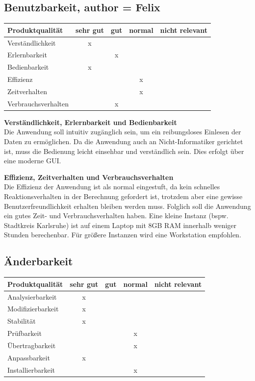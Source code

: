\documentclass[parskip=full]{scrartcl} %
\begin{document}
\subsection{Benutzbarkeit, author = Felix}

    \begin{tabular}{|l| c| c| c| c|}
    \hline
        Produktqualität & sehr gut & gut & normal & nicht relevant \\
    \hline
        Verständlichkeit & x & & &\\
    \hline
        Erlernbarkeit & & x & &\\
    \hline
        Bedienbarkeit & x & & &\\
    \hline
        Effizienz & & & x &\\
    \hline
        Zeitverhalten & & & x &\\
    \hline
        Verbrauchsverhalten & & x & &\\
    \hline
    \end{tabular}

\textbf{Verständlichkeit, Erlernbarkeit und Bedienbarkeit}\\
Die Anwendung soll intuitiv zugänglich sein, um ein reibungsloses Einlesen der Daten zu ermöglichen. Da die Anwendung auch an Nicht-Informatiker gerichtet ist, muss die Bedienung leicht einsehbar und verständlich sein. Dies erfolgt über eine moderne GUI.

\textbf{Effizienz, Zeitverhalten und Verbrauchsverhalten}\\
Die Effizienz der Anwendung ist als normal eingestuft, da kein schnelles Reaktionsverhalten in der Berechnung gefordert ist, trotzdem aber eine gewisse Benutzerfreundlichkeit erhalten bleiben werden muss. Folglich soll die Anwendung ein gutes Zeit- und Verbrauchsverhalten haben.
Eine kleine Instanz (bspw. Stadtkreis Karlsruhe) ist auf einem Laptop mit 8GB RAM innerhalb weniger Stunden berechenbar. Für größere Instanzen wird eine Workstation empfohlen.


\newpage 


\subsection{Änderbarkeit}
    \begin{tabular}{|l| c| c| c| c|}
    \hline
        Produktqualität & sehr gut & gut & normal & nicht relevant \\
    \hline
        Analysierbarkeit & x & & & \\
    \hline
        Modifizierbarkeit & x & & &\\
    \hline
        Stabilität & x & & &\\
    \hline
        Prüfbarkeit & & & x &\\
    \hline
        Übertragbarkeit & & & x &\\
    \hline
        Anpassbarkeit & x & & &\\
    \hline
        Installierbarkeit & & & x &\\
    \hline
    \end{tabular}
    
\end{document}
